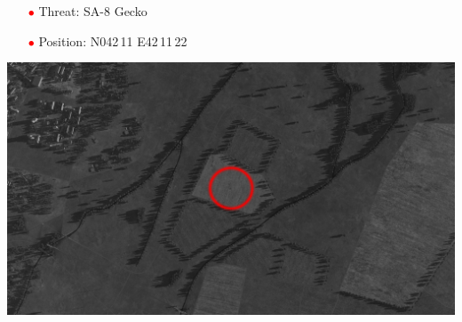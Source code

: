 \documentclass[a4paper,12pt,dvipsnames]{letter}
\newcommand{\myHead}[1]{{\LARGE\textsc{\textbf{#1}}}}
\newcommand{\ri}{\textcolor{Red}{$\bullet$\;}}
\begin{document}
{\begin{center}
\end{center}
%
\begin{itemize}
 \item[\ri] Threat: SA-8 Gecko
 \item[\ri] Position: N042\,11 E42\,11\,22 
\end{itemize}
%
\begin{center}
\includegraphics[width=0.7\linewidth]{../gimp/SA8_Sat.png}
\end{center}
%
%
%
}
\end{document}
